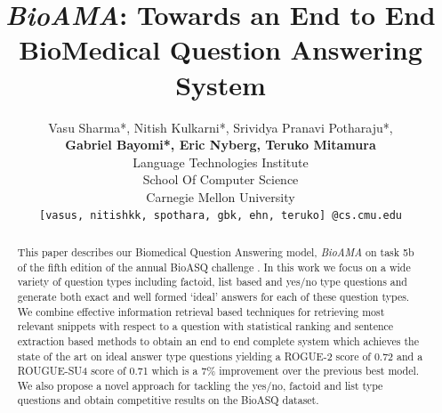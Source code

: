 \documentclass[11pt,a4paper]{article}
\title{\textit{BioAMA}: Towards an End to End BioMedical Question Answering System}
\author{Vasu Sharma*, Nitish Kulkarni*, Srividya Pranavi Potharaju*, \\\textbf{Gabriel Bayomi*, Eric Nyberg, Teruko Mitamura}\\
  Language Technologies Institute \\
  School Of Computer Science \\
  Carnegie Mellon University \\
  {\tt [vasus, nitishkk, spothara, gbk, ehn, teruko] @cs.cmu.edu}\\
  }
\date{}
\begin{document}
\maketitle
\begin{abstract}
This paper describes our Biomedical Question Answering model, \textit{BioAMA} on task 5b of the fifth edition of the annual BioASQ challenge \cite{bioasq}. In this work we focus on a wide variety of question types including  factoid, list based and yes/no type questions and generate both exact and well formed `ideal' answers for each of these question types. We combine effective information retrieval based techniques for retrieving most relevant snippets with respect to a question with statistical ranking and sentence extraction based methods to obtain an end to end complete system which achieves the state of the art on ideal answer type questions yielding a ROGUE-2 score of  0.72 and a ROUGUE-SU4 score of 0.71 which is a 7\%  improvement over the previous best model.\\We also propose a novel approach for tackling the yes/no, factoid and list type questions and obtain competitive results on the BioASQ dataset.

\end{abstract}
\end{document}
